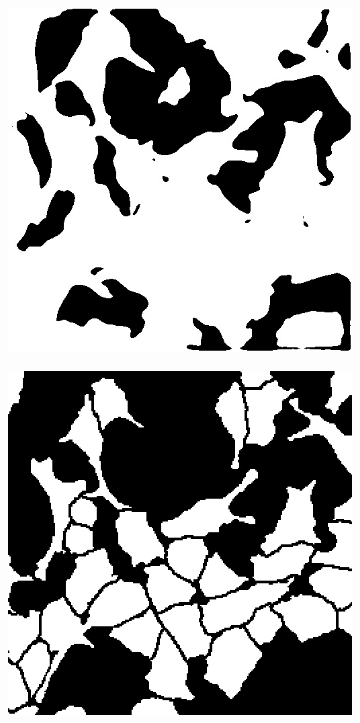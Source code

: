 \documentclass[10pt, journal, compsoc]{IEEEtran}
\begin{document}
\begin{figure}
\centering
\begin{subfigure}[b]{0.49\linewidth}
\includegraphics[width=\linewidth]{unet/110115-semantic.jpg}
\caption{}
\end{subfigure}
\begin{subfigure}[b]{0.49\linewidth}
\includegraphics[width=\linewidth]{unet/110115.jpg}

\end{subfigure}
\end{figure}
\end{document}
